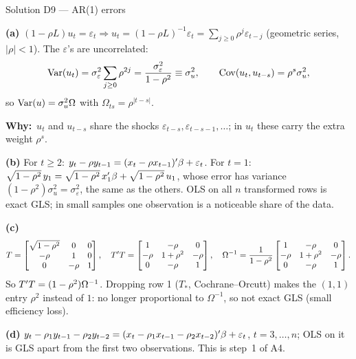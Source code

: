 \documentclass[11pt]{article}
\newcommand{\step}[1]{\par\smallskip\noindent\textbf{\textcolor{qnavy}{#1}}\quad\ignorespaces}
\newcommand{\Why}{\textbf{\textcolor{whyline}{Why:}}\ }
\begin{document}
\begin{solbox}{Solution D9 --- AR(1) errors}
\step{(a)} $(1 - \rho L)u_{t} = \varepsilon_{t} \Rightarrow u_{t} = (1-\rho L)^{-1}\varepsilon_{t}
= \sum_{j\ge0}\rho^{j}\varepsilon_{t-j}$ (geometric series, $|\rho| < 1$). The $\varepsilon$'s are uncorrelated:
\[
  \operatorname{Var}(u_{t}) = \sigma_{\varepsilon}^{2}\sum_{j\ge0}\rho^{2j} = \frac{\sigma_{\varepsilon}^{2}}{1-\rho^{2}} \equiv \sigma_{u}^{2},
  \qquad \operatorname{Cov}(u_{t},u_{t-s}) = \rho^{s}\sigma_{u}^{2},
\]
so $\operatorname{Var}(u) = \sigma_{u}^{2}\Omega$ with $\Omega_{ts} = \rho^{|t-s|}$.
\begin{why}\Why $u_{t}$ and $u_{t-s}$ share the shocks $\varepsilon_{t-s}, \varepsilon_{t-s-1},\dots$; in $u_{t}$
these carry the extra weight $\rho^{s}$.\end{why}
\step{(b)} For $t \ge 2$: $y_{t} - \rho y_{t-1} = (x_{t} - \rho x_{t-1})^{\prime}\beta + \varepsilon_{t}$.
For $t = 1$: $\sqrt{1-\rho^{2}}\,y_{1} = \sqrt{1-\rho^{2}}\,x_{1}^{\prime}\beta + \sqrt{1-\rho^{2}}\,u_{1}$, whose error
has variance $(1-\rho^{2})\sigma_{u}^{2} = \sigma_{\varepsilon}^{2}$, the same as the others. OLS on all $n$
transformed rows is exact GLS; in small samples one observation is a noticeable share of the data.
\step{(c)}
\[
  T = \begin{bmatrix} \sqrt{1-\rho^{2}} & 0 & 0 \\ -\rho & 1 & 0 \\ 0 & -\rho & 1\end{bmatrix},\quad
  T^{\prime} T = \begin{bmatrix} 1 & -\rho & 0 \\ -\rho & 1+\rho^{2} & -\rho \\ 0 & -\rho & 1\end{bmatrix},\quad
  \Omega^{-1} = \frac{1}{1-\rho^{2}}\begin{bmatrix} 1 & -\rho & 0 \\ -\rho & 1+\rho^{2} & -\rho \\ 0 & -\rho & 1\end{bmatrix}.
\]
So $T^{\prime} T = (1-\rho^{2})\Omega^{-1}$. Dropping row 1 ($T_{*}$, Cochrane--Orcutt) makes the
$(1,1)$ entry $\rho^{2}$ instead of $1$: no longer proportional to $\Omega^{-1}$, so not exact GLS (small efficiency loss).
\step{(d)} $y_{t} - \rho_{1}y_{t-1} - \rho_{2}y_{t-2} = (x_{t} - \rho_{1}x_{t-1} - \rho_{2}x_{t-2})^{\prime}\beta + \varepsilon_{t}$,
$t = 3,\dots,n$; OLS on it is GLS apart from the first two observations. This is step~1 of A4.
\end{solbox}
\end{document}
